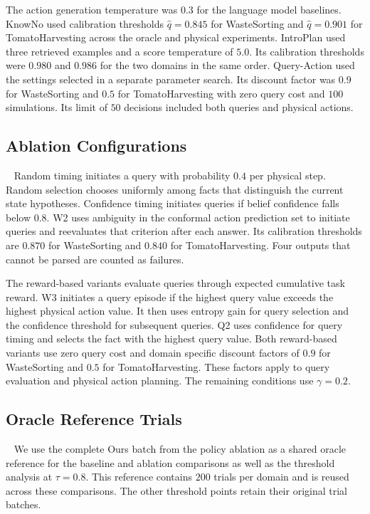 The action generation temperature was $0.3$ for the language model baselines. KnowNo used calibration thresholds $\hat{q}=0.845$ for WasteSorting and $\hat{q}=0.901$ for TomatoHarvesting across the oracle and physical experiments. IntroPlan used three retrieved examples and a score temperature of $5.0$. Its calibration thresholds were $0.980$ and $0.986$ for the two domains in the same order. Query-Action used the settings selected in a separate parameter search. Its discount factor was $0.9$ for WasteSorting and $0.5$ for TomatoHarvesting with zero query cost and $100$ simulations. Its limit of $50$ decisions included both queries and physical actions.

\subsection{Ablation Configurations}~\label{appx:ablation_configs}
Random timing initiates a query with probability $0.4$ per physical step. Random selection chooses uniformly among facts that distinguish the current state hypotheses. Confidence timing initiates queries if belief confidence falls below $0.8$. W2 uses ambiguity in the conformal action prediction set to initiate queries and reevaluates that criterion after each answer. Its calibration thresholds are $0.870$ for WasteSorting and $0.840$ for TomatoHarvesting. Four outputs that cannot be parsed are counted as failures.

The reward-based variants evaluate queries through expected cumulative task reward. W3 initiates a query episode if the highest query value exceeds the highest physical action value. It then uses entropy gain for query selection and the confidence threshold for subsequent queries. Q2 uses confidence for query timing and selects the fact with the highest query value. Both reward-based variants use zero query cost and domain specific discount factors of $0.9$ for WasteSorting and $0.5$ for TomatoHarvesting. These factors apply to query evaluation and physical action planning. The remaining conditions use $\gamma=0.2$.

\subsection{Oracle Reference Trials}~\label{appx:oracle_reference}
We use the complete Ours batch from the policy ablation as a shared oracle reference for the baseline and ablation comparisons as well as the threshold analysis at $\tau=0.8$. This reference contains $200$ trials per domain and is reused across these comparisons. The other threshold points retain their original trial batches.

